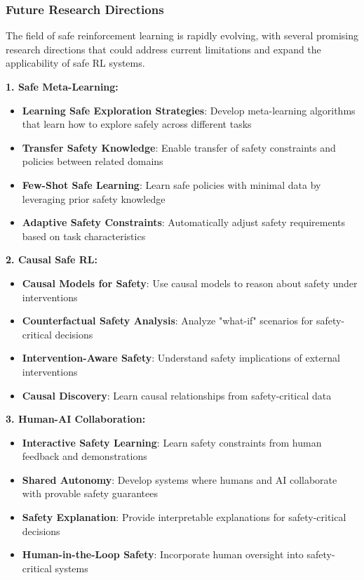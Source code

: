 \documentclass[12pt]{article}
\begin{document}
{{{{\subsubsection{Future Research Directions}

The field of safe reinforcement learning is rapidly evolving, with several promising research directions that could address current limitations and expand the applicability of safe RL systems.

\textbf{1. Safe Meta-Learning:}
\begin{itemize}
\item \textbf{Learning Safe Exploration Strategies}: Develop meta-learning algorithms that learn how to explore safely across different tasks
\item \textbf{Transfer Safety Knowledge}: Enable transfer of safety constraints and policies between related domains
\item \textbf{Few-Shot Safe Learning}: Learn safe policies with minimal data by leveraging prior safety knowledge
\item \textbf{Adaptive Safety Constraints}: Automatically adjust safety requirements based on task characteristics
\end{itemize}

\textbf{2. Causal Safe RL:}
\begin{itemize}
\item \textbf{Causal Models for Safety}: Use causal models to reason about safety under interventions
\item \textbf{Counterfactual Safety Analysis}: Analyze "what-if" scenarios for safety-critical decisions
\item \textbf{Intervention-Aware Safety}: Understand safety implications of external interventions
\item \textbf{Causal Discovery}: Learn causal relationships from safety-critical data
\end{itemize}

\textbf{3. Human-AI Collaboration:}
\begin{itemize}
\item \textbf{Interactive Safety Learning}: Learn safety constraints from human feedback and demonstrations
\item \textbf{Shared Autonomy}: Develop systems where humans and AI collaborate with provable safety guarantees
\item \textbf{Safety Explanation}: Provide interpretable explanations for safety-critical decisions
\item \textbf{Human-in-the-Loop Safety}: Incorporate human oversight into safety-critical systems
\end{itemize}

}}}}
\end{document}
